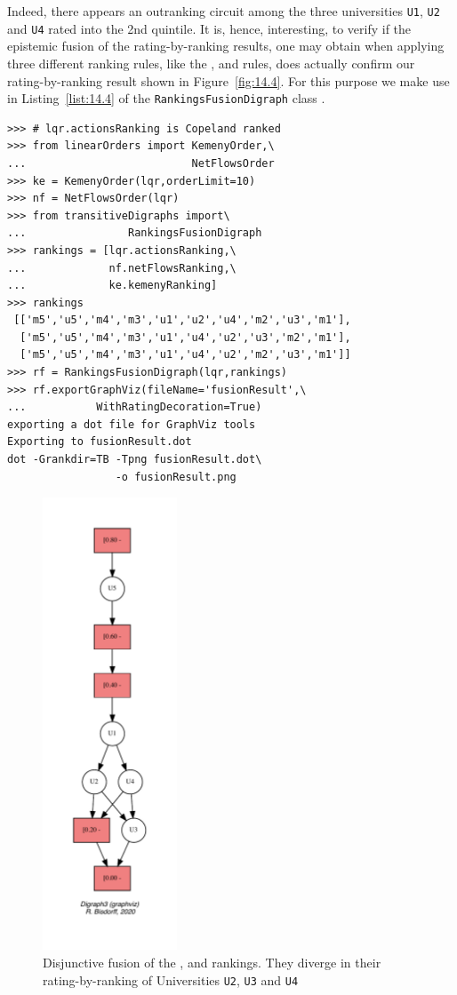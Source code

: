 Indeed, there appears an outranking circuit among the three universities \texttt{U1}, \texttt{U2} and \texttt{U4} rated into the 2nd quintile. It is, hence, interesting, to verify if the epistemic fusion of the rating-by-ranking results, one may obtain when applying three different ranking rules, like the \Kemeny, \Copeland and \NetFlows rules, does actually confirm our rating-by-ranking result shown in Figure~\vref{fig:14.4}. For this purpose we make use in Listing~\vref{list:14.4} of the \texttt{RankingsFusionDigraph} class .
\begin{lstlisting}[caption={Computing the epistemic fusion of two rating-by-rankig results},label=list:14.4]
>>> # lqr.actionsRanking is Copeland ranked
>>> from linearOrders import KemenyOrder,\
...                          NetFlowsOrder
>>> ke = KemenyOrder(lqr,orderLimit=10)
>>> nf = NetFlowsOrder(lqr)
>>> from transitiveDigraphs import\
...                RankingsFusionDigraph
>>> rankings = [lqr.actionsRanking,\
...             nf.netFlowsRanking,\
...             ke.kemenyRanking]
>>> rankings
 [['m5','u5','m4','m3','u1','u2','u4','m2','u3','m1'],
  ['m5','u5','m4','m3','u1','u4','u2','u3','m2','m1'],
  ['m5','u5','m4','m3','u1','u4','u2','m2','u3','m1']]
>>> rf = RankingsFusionDigraph(lqr,rankings)
>>> rf.exportGraphViz(fileName='fusionResult',\
...           WithRatingDecoration=True)
exporting a dot file for GraphViz tools
Exporting to fusionResult.dot
dot -Grankdir=TB -Tpng fusionResult.dot\
                 -o fusionResult.png
\end{lstlisting}
\begin{figure}[ht]
\sidecaption[t]
\includegraphics[width=4cm]{Figures/14-5-fusionResult.pdf}
\caption{Disjunctive fusion of the \Kemeny, \Copeland and \NetFlows rankings. They diverge in their rating-by-ranking of Universities \texttt{U2}, \texttt{U3} and \texttt{U4}}
\label{fig:14.5}       %
\end{figure}

